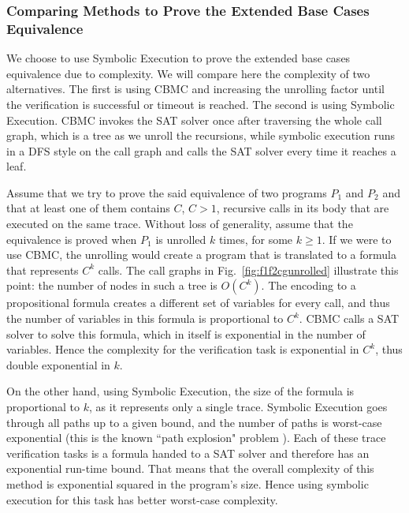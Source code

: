 \subsubsection{Comparing Methods to Prove the Extended Base Cases Equivalence}
We choose to use Symbolic Execution to prove the extended base cases equivalence due to complexity. We will compare here the complexity of two alternatives. The first is using CBMC and increasing the unrolling factor until the verification is successful or timeout is reached. The second is using Symbolic Execution. 
CBMC invokes the SAT solver once after traversing the whole call graph, which is a tree as we unroll the recursions, while symbolic execution runs in a DFS style on the call graph and calls the SAT solver every time it reaches a leaf.

Assume that we try to prove the said equivalence of two programs $P_1$ and $P_2$ and that at least one of them contains $C$, $C>1$, recursive calls in its body that are executed on the same trace. Without loss of generality, assume that the equivalence is proved when $P_1$ is unrolled $k$ times, for some $k \geq 1$. 
If we were to use CBMC, the unrolling would create a program that is translated to a formula that represents  $C^k$ calls. The call graphs in Fig.~\ref{fig:f1f2cgunrolled} illustrate this point: the number of nodes in such a tree is $O(C^k)$. The encoding to a propositional formula creates a different set of variables for every call, and thus the number of variables in this formula is proportional to $C^k$. CBMC calls a SAT solver to solve this formula, which in itself is exponential in the number of variables. Hence the complexity for the verification task is exponential in $C^k$, thus double exponential in $k$.

On the other hand, using Symbolic Execution, the size of the formula is proportional to $k$, as it represents only a single trace. Symbolic Execution goes through all paths up to a given bound, and the number of paths is worst-case exponential (this is the known ``path explosion" problem  \cite{10.1007/978-3-540-78800-3_28}). Each of these trace verification tasks is a formula handed to a SAT solver and therefore has an exponential run-time bound. That means that the overall complexity of this method is exponential squared in the program's size. 
Hence using symbolic execution for this task has better worst-case complexity.

